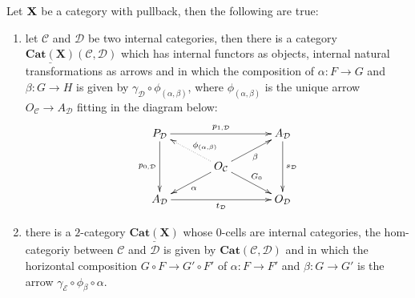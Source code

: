 \documentclass[a4paper,UKenglish,cleveref,pdftex,thm-restate,numberwithinsect]{lipics-v2021}
\newcommand{\cat}[1]{\ensuremath{\mathbf{#1}}}
\newcommand{\cate}[1]{\mathbf{Cat}(\cat{#1})}
\newcommand{\dcate}[1]{\underline{\mathbf{Cat}(\cat{#1})}}
\def\X{\textbf {\textup{X}}}
\begin{document}
	
\begin{theorem}\label{thm:due}
	Let $\X$ be a category with pullback, then the following are true:
	\begin{enumerate}
\item let $\mathcal{C}$ and $\mathcal{D}$ be two internal categories, then there is a category $\dcate{X}(\mathcal{C}, \mathcal{D})$ which has internal functors as objects, internal natural transformations as arrows and in which the composition of $\alpha\colon F\to G$ and $\beta \colon G\to H$ is given by $\gamma_{\mathcal{D}}\circ \phi_{(\alpha, \beta)}$, where $\phi_{(\alpha, \beta)}$  is the unique arrow $O_{\mathcal{C}}\to A_{\mathcal{D}}$ fitting in the diagram below:
\[\xymatrix@C=35pt@R=15pt{ P_{\mathcal{D}} \ar[rr]^{p_{1, \mathcal{D}}} \ar[dd]_{p_{0, \mathcal{D}}} && A_{\mathcal{D}} \ar[dd]^{s_{\mathcal{D}}} \\ & O_{\mathcal{C}} \ar[dr]^{G_0} \ar@{.>}[ul]_(.4){\phi_{(\alpha, \beta)}} \ar[ur]_{\beta} \ar[dl]^{\alpha}\\ A_{\mathcal{D}} \ar[rr]_{t_{\mathcal{D}}}&& O_{\mathcal{D}}   }\]
\item there is a $2$-category $\dcate{X}$ whose $0$-cells are internal categories, the hom-categoriy between $\mathcal{C}$ and $\mathcal{D}$ is given by $\cate{\mathcal{C}, \mathcal{D}}$ and in which the horizontal composition $G\circ F\to G'\circ F'$ of $\alpha \colon F\to F'$ and $\beta\colon G\to G' $ is the arrow $\gamma_{\mathcal{E}}\circ \phi_{\beta}\circ \alpha$.
\end{enumerate}
\end{theorem}	
	
\end{document}
